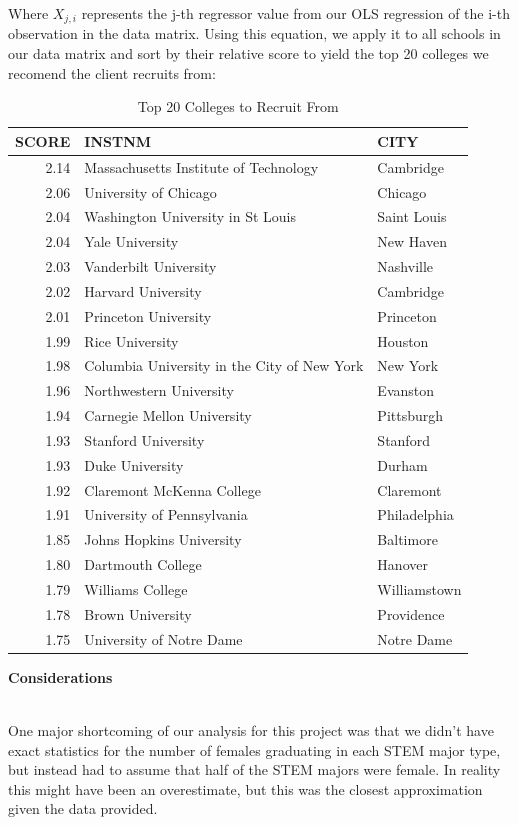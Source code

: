 \documentclass[11pt,english]{article}
\begin{document}
Where $X_{j,i}$ represents the j-th regressor value from our OLS regression of the i-th observation in the data matrix. Using this equation, we apply it to all schools in our data matrix and sort by their relative score to yield the top 20 colleges we recomend the client recruits from:
\begin{table}[ht]
\centering
\begin{tabular}{rll}
  \hline
SCORE & INSTNM & CITY \\ 
  \hline
2.14 & Massachusetts Institute of Technology & Cambridge \\ 
  2.06 & University of Chicago & Chicago \\ 
  2.04 & Washington University in St Louis & Saint Louis \\ 
  2.04 & Yale University & New Haven \\ 
  2.03 & Vanderbilt University & Nashville \\ 
  2.02 & Harvard University & Cambridge \\ 
  2.01 & Princeton University & Princeton \\ 
  1.99 & Rice University & Houston \\ 
  1.98 & Columbia University in the City of New York & New York \\ 
  1.96 & Northwestern University & Evanston \\ 
  1.94 & Carnegie Mellon University & Pittsburgh \\ 
  1.93 & Stanford University & Stanford \\ 
  1.93 & Duke University & Durham \\ 
  1.92 & Claremont McKenna College & Claremont \\ 
  1.91 & University of Pennsylvania & Philadelphia \\ 
  1.85 & Johns Hopkins University & Baltimore \\ 
  1.80 & Dartmouth College & Hanover \\ 
  1.79 & Williams College & Williamstown \\ 
  1.78 & Brown University & Providence \\ 
  1.75 & University of Notre Dame & Notre Dame \\ 
   \hline
\end{tabular}
\caption{Top 20 Colleges to Recruit From} 
\end{table}
\newpage

{\large\textbf{Considerations}} \\\

One major shortcoming of our analysis for this project was that we didn't have exact statistics for the number of females graduating in each STEM major type, but instead had to assume that half of the STEM majors were female. In reality this might have been an overestimate, but this was the closest approximation given the data provided.
\end{document}
